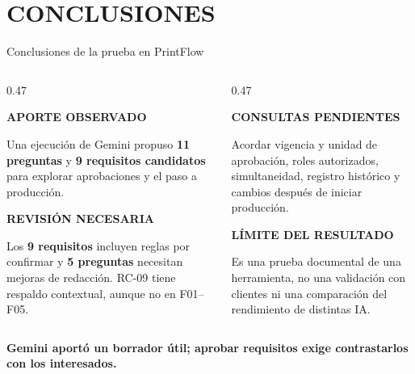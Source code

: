 \documentclass[aspectratio=169,12pt]{beamer}
\newcommand{\etiqueta}[1]{{\fontsize{7.5}{9}\selectfont\bfseries\color{Accent}#1\par}}
\newcommand{\fuentesactuales}{}
\newcommand{\fuentesdiapositiva}[1]{\gdef\fuentesactuales{#1}}
\begin{document}
\section{CONCLUSIONES}
\begin{frame}[t,shrink=14]{Conclusiones de la prueba en PrintFlow}
\fuentesdiapositiva{Resultados: evidencias/respuesta-ia.txt y evidencias/revision-respuesta.txt}
\vspace{1mm}
\begin{columns}[T,onlytextwidth]
\begin{column}{0.47\textwidth}
\etiqueta{APORTE OBSERVADO}
\vspace{1.5mm}
{\fontsize{10.2}{13}\selectfont
Una ejecución de Gemini propuso \textbf{11 preguntas} y \textbf{9 requisitos candidatos} para explorar aprobaciones y el paso a producción.\par}
\vspace{4mm}
\etiqueta{REVISIÓN NECESARIA}
\vspace{1.5mm}
{\fontsize{10.2}{13}\selectfont
Los \textbf{9 requisitos} incluyen reglas por confirmar y \textbf{5 preguntas} necesitan mejoras de redacción. RC-09 tiene respaldo contextual, aunque no en F01--F05.\par}
\end{column}
\begin{column}{0.47\textwidth}
\etiqueta{CONSULTAS PENDIENTES}
\vspace{1.5mm}
{\fontsize{10.2}{13}\selectfont
Acordar vigencia y unidad de aprobación, roles autorizados, simultaneidad, registro histórico y cambios después de iniciar producción.\par}
\vspace{4mm}
\etiqueta{LÍMITE DEL RESULTADO}
\vspace{1.5mm}
{\fontsize{10.2}{13}\selectfont
Es una prueba documental de una herramienta, no una validación con clientes ni una comparación del rendimiento de distintas IA.\par}
\end{column}
\end{columns}
\vspace{3mm}
{\fontsize{9}{11}\selectfont\bfseries\color{Accent}
Gemini aportó un borrador útil; aprobar requisitos exige contrastarlos con los interesados.\par}
\vspace{1mm}
\end{frame}
\end{document}
